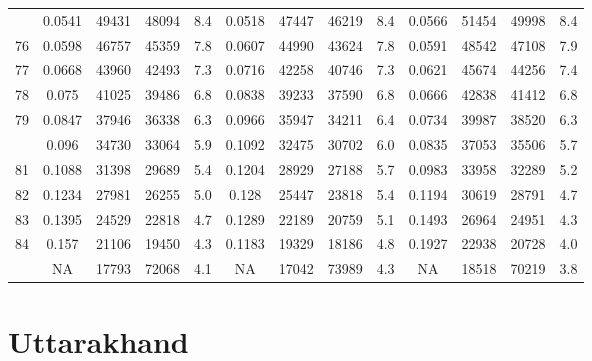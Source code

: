 \documentclass[
  14pt,
]{article}
\begin{document}
\begin{longtable}[t]{lcccccccccccc}
\addlinespace
75 & 0.0541 & 49431 & 48094 & 8.4 & 0.0518 & 47447 & 46219 & 8.4 & 0.0566 & 51454 & 49998 & 8.4\\
76 & 0.0598 & 46757 & 45359 & 7.8 & 0.0607 & 44990 & 43624 & 7.8 & 0.0591 & 48542 & 47108 & 7.9\\
77 & 0.0668 & 43960 & 42493 & 7.3 & 0.0716 & 42258 & 40746 & 7.3 & 0.0621 & 45674 & 44256 & 7.4\\
78 & 0.075 & 41025 & 39486 & 6.8 & 0.0838 & 39233 & 37590 & 6.8 & 0.0666 & 42838 & 41412 & 6.8\\
79 & 0.0847 & 37946 & 36338 & 6.3 & 0.0966 & 35947 & 34211 & 6.4 & 0.0734 & 39987 & 38520 & 6.3\\
\addlinespace
80 & 0.096 & 34730 & 33064 & 5.9 & 0.1092 & 32475 & 30702 & 6.0 & 0.0835 & 37053 & 35506 & 5.7\\
81 & 0.1088 & 31398 & 29689 & 5.4 & 0.1204 & 28929 & 27188 & 5.7 & 0.0983 & 33958 & 32289 & 5.2\\
82 & 0.1234 & 27981 & 26255 & 5.0 & 0.128 & 25447 & 23818 & 5.4 & 0.1194 & 30619 & 28791 & 4.7\\
83 & 0.1395 & 24529 & 22818 & 4.7 & 0.1289 & 22189 & 20759 & 5.1 & 0.1493 & 26964 & 24951 & 4.3\\
84 & 0.157 & 21106 & 19450 & 4.3 & 0.1183 & 19329 & 18186 & 4.8 & 0.1927 & 22938 & 20728 & 4.0\\
\addlinespace
85 & NA & 17793 & 72068 & 4.1 & NA & 17042 & 73989 & 4.3 & NA & 18518 & 70219 & 3.8\\*
\end{longtable}

\pagebreak

\hypertarget{uttarakhand}{%
\section{Uttarakhand}\label{uttarakhand}}
\end{document}
